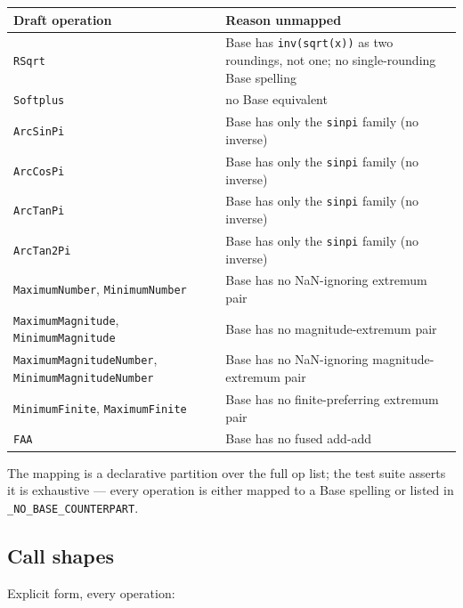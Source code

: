 \begin{table}[h]
\centering
\begin{tabulary}{\linewidth}{L L}
\toprule
Draft operation & Reason unmapped \\
\toprule
\texttt{RSqrt} & Base has \texttt{inv(sqrt(x))} as two roundings, not one; no single-rounding Base spelling \\
\texttt{Softplus} & no Base equivalent \\
\texttt{ArcSinPi} & Base has only the \texttt{sinpi} family (no inverse) \\
\texttt{ArcCosPi} & Base has only the \texttt{sinpi} family (no inverse) \\
\texttt{ArcTanPi} & Base has only the \texttt{sinpi} family (no inverse) \\
\texttt{ArcTan2Pi} & Base has only the \texttt{sinpi} family (no inverse) \\
\texttt{MaximumNumber}, \texttt{MinimumNumber} & Base has no NaN-ignoring extremum pair \\
\texttt{MaximumMagnitude}, \texttt{MinimumMagnitude} & Base has no magnitude-extremum pair \\
\texttt{MaximumMagnitudeNumber}, \texttt{MinimumMagnitudeNumber} & Base has no NaN-ignoring magnitude-extremum pair \\
\texttt{MinimumFinite}, \texttt{MaximumFinite} & Base has no finite-preferring extremum pair \\
\texttt{FAA} & Base has no fused add-add \\
\bottomrule
\end{tabulary}

\end{table}



The mapping is a declarative partition over the full op list; the test suite asserts it is exhaustive — every operation is either mapped to a Base spelling or listed in \texttt{\_\allowbreak{}NO\_\allowbreak{}BASE\_\allowbreak{}COUNTERPART}.



\subsection{Call shapes}



\label{8684074389003448897}{}


Explicit form, every operation:




